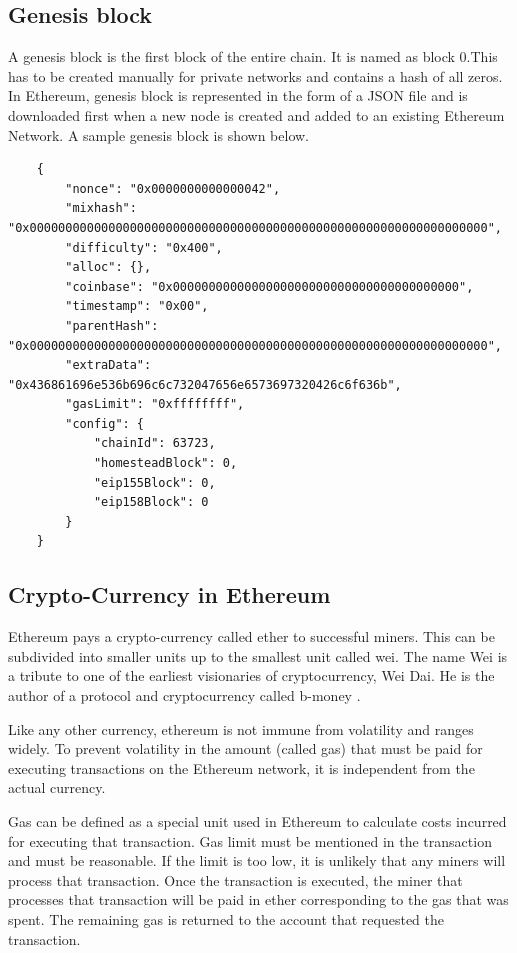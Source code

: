 \documentclass[11pt,openright]{report}
\begin{document}
\subsection{Genesis block}
A genesis block is the first block of the entire chain. It is named as block 0.This has to be created manually for private networks and contains a hash of all zeros. In Ethereum, genesis block is represented in the form of a JSON file and is downloaded first when a new node is created and added to an existing Ethereum Network. A sample genesis block is shown below.
\begin{verbatim}
    {
        "nonce": "0x0000000000000042",
        "mixhash": "0x0000000000000000000000000000000000000000000000000000000000000000",
        "difficulty": "0x400",
        "alloc": {}, 
        "coinbase": "0x0000000000000000000000000000000000000000",
        "timestamp": "0x00",
        "parentHash": "0x0000000000000000000000000000000000000000000000000000000000000000",
        "extraData": "0x436861696e536b696c6c732047656e6573697320426c6f636b",
        "gasLimit": "0xffffffff",
        "config": {
            "chainId": 63723,
            "homesteadBlock": 0,
            "eip155Block": 0,
            "eip158Block": 0
        }
    }
\end{verbatim}


\subsection{Crypto-Currency in Ethereum}
Ethereum pays a crypto-currency called ether to successful miners. This can be subdivided into smaller units up to the smallest unit called wei. The name Wei is a tribute to one of the earliest visionaries of cryptocurrency, Wei Dai. He is the author of a protocol and cryptocurrency called b-money \cite{dai1998bmoney}.

Like any other currency, ethereum is not immune from volatility and ranges widely. To prevent volatility in the amount (called gas) that must be paid for executing transactions on the Ethereum network, it is independent from the actual currency. 

Gas can be defined as a special unit used in Ethereum to calculate costs incurred for executing that transaction. Gas limit must be mentioned in the transaction and must be reasonable. If the limit is too low, it is unlikely that any miners will process that transaction. Once the transaction is executed, the miner that processes that transaction will be paid in ether corresponding to the gas that was spent. The remaining gas is returned to the account that requested the transaction.
\end{document}
